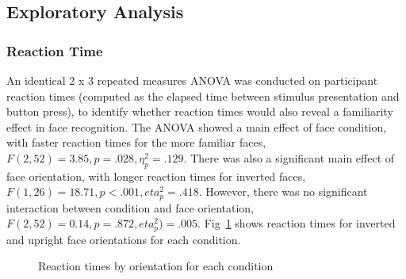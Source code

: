 \documentclass[
  10pt,
  letterpaper,
]{article}
\begin{document}
\subsection{Exploratory Analysis}\label{exploratory-analysis}

\subsubsection{Reaction Time}\label{reaction-time}

An identical 2 x 3 repeated measures ANOVA was conducted on participant
reaction times (computed as the elapsed time between stimulus
presentation and button press), to identify whether reaction times would
also reveal a familiarity effect in face recognition. The ANOVA showed a
main effect of face condition, with faster reaction times for the more
familiar faces, \(F(2, 52) = 3.85, p = .028, \eta_p^2 = .129\). There
was also a significant main effect of face orientation, with longer
reaction times for inverted faces,
\(F(1, 26) = 18.71, p <.001, eta_p^2 = .418\). However, there was no
significant interaction between condition and face orientation,
\(F(2, 52) = 0.14, p = .872, eta_p^2) = .005\).
Fig~\ref{fig-reaction-times} shows reaction times for inverted and
upright face orientations for each condition.

\label{cell-fig-reaction-times}
\begin{figure}[H]


\caption{\label{fig-reaction-times}Reaction times by orientation for
each condition}

\end{figure}%
\end{document}
